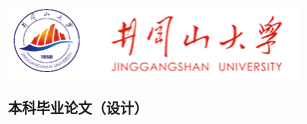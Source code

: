 \documentclass[zihao=-4, linespread=1.0]{ctexrep}
\begin{document}
\vspace{14pt}
\begin{center}
    \includegraphics[width=7.7cm]{emblem.png}
\end{center}
\vspace{36pt}
\begin{center}
    \fontsize{30pt}{36pt} \textbf{本科毕业论文（设计）}
\end{center}
\vspace{45pt}
\end{document}
